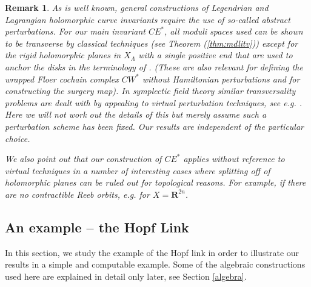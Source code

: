 \documentclass{gtpart}
\newtheorem{rem}[thm]{Remark}
\renewcommand{\R}{\mathbf{R}}
\begin{document}
\begin{rem}
As is well known, general constructions of Legendrian and Lagrangian holomorphic curve invariants
    require the use of so-called abstract perturbations. For our main invariant $CE^{\ast}$,   
all moduli spaces used can be shown to be transverse by classical techniques (see Theorem (\ref{thm:mdlitv})) except for the rigid holomorphic planes in $X_\Lambda$ with a single positive end that are used to anchor the disks in the terminology of \cite{BEE}.  (These are also relevant for defining the wrapped Floer cochain complex $CW^*$ without Hamiltonian perturbations and for constructing the surgery map). In symplectic field theory similar transversality problems are dealt with by appealing to virtual perturbation techniques, see e.g. \cite{FOOO,Hofer,Pardon,HondaBao}. 
Here we will not work out the details of this but merely assume such a perturbation scheme has been fixed. Our results are independent of the particular choice.

We also point out that our construction of $CE^{\ast}$ applies without reference to virtual techniques in a number of interesting cases where splitting off of holomorphic planes can be ruled  out for topological reasons. For example, if there are no contractible Reeb orbits, e.g. for $X=\R^{2n}$.  


\end{rem}




\subsection{An example -- the Hopf Link}\label{ssec:Hopflink}

In this section, we study the example of the Hopf link in order to illustrate our results in a simple and computable example. Some of the algebraic constructions used here are
explained in detail only later, see Section \ref{algebra}. 
\end{document}
